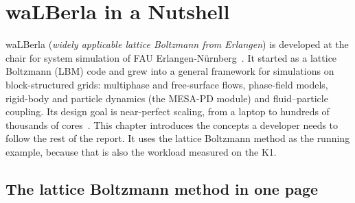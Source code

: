\chapter{waLBerla in a Nutshell}\label{r02:ch:walberla}

waLBerla (\emph{widely applicable lattice Boltzmann from Erlangen}) is developed at the
chair for system simulation of FAU Erlangen-Nürnberg~\cite{walberla,walberla-repo}. It
started as a lattice Boltzmann (LBM) code and grew into a general framework for
simulations on block-structured grids: multiphase and free-surface flows, phase-field
models, rigid-body and particle dynamics (the MESA-PD module) and fluid--particle
coupling. Its design goal is near-perfect scaling, from a laptop to hundreds of
thousands of cores~\cite{schornbaum-blockforest}. This chapter introduces the concepts a
developer needs to follow the rest of the report. It uses the lattice Boltzmann method
as the running example, because that is also the workload measured on the K1.

\section{The lattice Boltzmann method in one page}\label{r02:sec:lbm}

